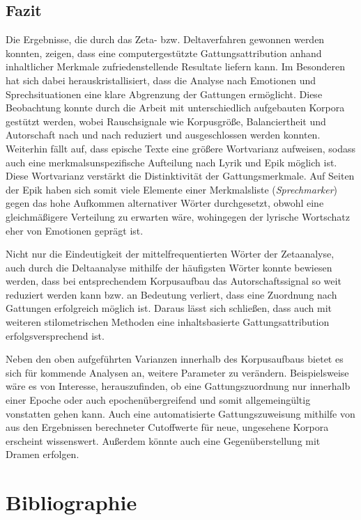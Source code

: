 \documentclass[a4paper,10p]{article}
\begin{document}
\subsection{Fazit}
Die Ergebnisse, die durch das Zeta- bzw. Deltaverfahren gewonnen werden konnten, zeigen, dass eine computergestützte Gattungsattribution anhand inhaltlicher Merkmale zufriedenstellende Resultate liefern kann. Im Besonderen hat sich dabei herauskristallisiert, dass die Analyse nach Emotionen und Sprechsituationen eine klare Abgrenzung der Gattungen ermöglicht. Diese Beobachtung konnte durch die Arbeit mit unterschiedlich aufgebauten Korpora gestützt werden, wobei Rauschsignale wie Korpusgröße, Balanciertheit und Autorschaft nach und nach reduziert und ausgeschlossen werden konnten. Weiterhin fällt auf, dass epische Texte eine größere Wortvarianz aufweisen, sodass auch eine merkmalsunspezifische Aufteilung nach Lyrik und Epik möglich ist. Diese Wortvarianz verstärkt die Distinktivität der Gattungsmerkmale. Auf Seiten der Epik haben sich somit viele Elemente einer Merkmalsliste (\textit{Sprechmarker}) gegen das hohe Aufkommen alternativer Wörter durchgesetzt, obwohl eine gleichmäßigere Verteilung zu erwarten wäre, wohingegen der lyrische Wortschatz eher von Emotionen geprägt ist. \par 

Nicht nur die Eindeutigkeit der mittelfrequentierten Wörter der Zetaanalyse, auch durch die Deltaanalyse mithilfe der häufigsten Wörter konnte bewiesen werden, dass bei entsprechendem Korpusaufbau das Autorschaftssignal so weit reduziert werden kann bzw. an Bedeutung verliert, dass eine Zuordnung nach Gattungen erfolgreich möglich ist. Daraus lässt sich schließen, dass auch mit weiteren stilometrischen Methoden eine inhaltsbasierte Gattungsattribution erfolgsversprechend ist. \par 

Neben den oben aufgeführten Varianzen innerhalb des Korpusaufbaus bietet es sich für kommende Analysen an, weitere Parameter zu verändern. Beispielsweise wäre es von Interesse, herauszufinden, ob eine Gattungszuordnung nur innerhalb einer Epoche oder auch epochenübergreifend und somit allgemeingültig vonstatten gehen kann. Auch eine automatisierte Gattungszuweisung mithilfe von aus den Ergebnissen berechneter Cutoffwerte für neue, ungesehene Korpora erscheint wissenswert. Außerdem könnte auch eine Gegenüberstellung mit Dramen erfolgen.






\section{Bibliographie}


\end{document}
